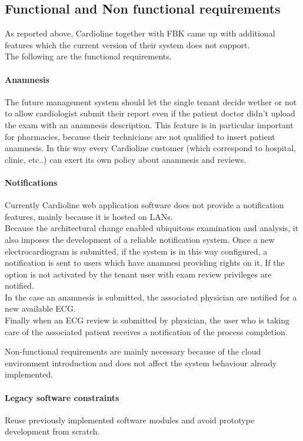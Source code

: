 \subsection{Functional and Non functional requirements} As reported above, Cardioline together with FBK came up with additional features which the current version of their system does not support.\\The following are the functional requirements.
\paragraph{Anamnesis}The future management system should let the single tenant decide wether or not to allow cardiologist submit their report even if the patient doctor didn't upload the exam with an anamnesis description. This feature is in particular important for pharmacies, because their technicians are not qualified to insert patient anamnesis. In this way every Cardioline customer (which correspond to hospital, clinic, etc..) can exert its own policy about anamnesis and reviews.
\paragraph{Notifications}Currently Cardioline web application software does not provide a notification features, mainly because it is hosted on LANs.\\Because the architectural change enabled ubiquitous examination and analysis, it also imposes the development of a reliable notification system. Once a new electrocardiogram is submitted, if the system is in this way configured, a notification is sent to users which have anamnesi providing rights on it. If the option is not activated by the tenant user with exam review privileges are notified.\\In the case an anamnesis is submitted, the associated physician are notified for a new available ECG.\\Finally when an ECG review is submitted by physician, the user who is taking care of the associated patient receives a notification of the process completion.

Non-functional requirements are mainly necessary because of the cloud environment introduction and does not affect the system behaviour already implemented.

\paragraph{Legacy software constraints}
Reuse previously implemented software modules and avoid prototype development from scratch.
